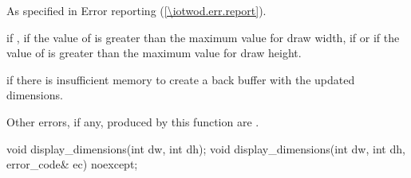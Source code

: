 \begin{itemdescr}
\pnum
\throws
As specified in Error reporting (\ref{\iotwod.err.report}).

\pnum
\errors
{} if , if the value of  is greater than the maximum value for draw width, if  or if the value of  is greater than the maximum value for draw height.

\pnum
{} if there is insufficient memory to create a back buffer with the updated dimensions.

\pnum
Other errors, if any, produced by this function are .
\end{itemdescr}

%
\begin{itemdecl}
void display_dimensions(int dw, int dh);
void display_dimensions(int dw, int dh, error_code& ec) noexcept;
\end{itemdecl}

